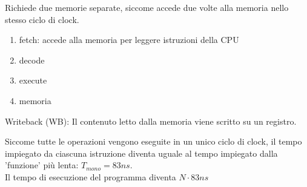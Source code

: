 \documentclass[../ace.tex]{subfiles}
\begin{document}
Richiede due memorie separate, siccome accede due volte alla memoria nello stesso ciclo di clock.

\begin{enumerate}
    \item fetch: accede alla memoria per leggere istruzioni della CPU
    \item decode
    \item execute
    \item memoria
\end{enumerate}

Writeback (WB): Il contenuto letto dalla memoria viene scritto su un registro.

Siccome tutte le operazioni vengono eseguite in un unico ciclo di clock, il tempo impiegato da ciascuna istruzione diventa uguale al tempo impiegato dalla 'funzione' più lenta: $T_{mono} = 83 ns$.
\\
Il tempo di esecuzione del programma diventa $N \cdot 83ns$
\end{document}
